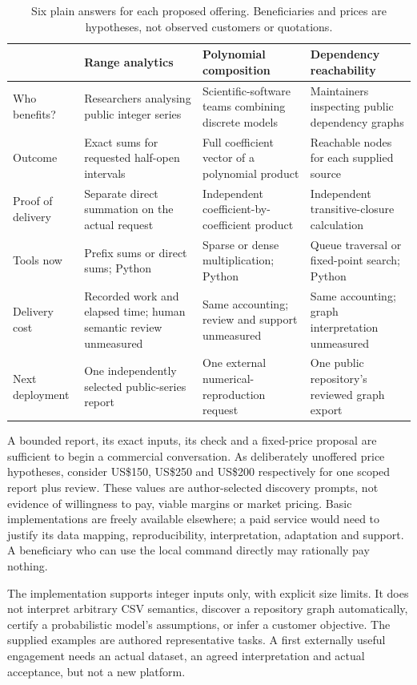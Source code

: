 \documentclass[11pt,letterpaper]{article}
\begin{document}
\begin{table}[htbp]\centering\small
\caption{Six plain answers for each proposed offering. Beneficiaries and prices are hypotheses, not observed customers or quotations.}
\begin{tabularx}{\linewidth}{@{}P{2.2cm}YYY@{}}\toprule
& Range analytics & Polynomial composition & Dependency reachability\\\midrule
Who benefits? & Researchers analysing public integer series & Scientific-software teams combining discrete models & Maintainers inspecting public dependency graphs\\
Outcome & Exact sums for requested half-open intervals & Full coefficient vector of a polynomial product & Reachable nodes for each supplied source\\
Proof of delivery & Separate direct summation on the actual request & Independent coefficient-by-coefficient product & Independent transitive-closure calculation\\
Tools now & Prefix sums or direct sums; Python & Sparse or dense multiplication; Python & Queue traversal or fixed-point search; Python\\
Delivery cost & Recorded work and elapsed time; human semantic review unmeasured & Same accounting; review and support unmeasured & Same accounting; graph interpretation unmeasured\\
Next deployment & One independently selected public-series report & One external numerical-reproduction request & One public repository's reviewed graph export\\\bottomrule
\end{tabularx}
\label{tab:offers}
\end{table}

A bounded report, its exact inputs, its check and a fixed-price proposal are sufficient to begin a commercial conversation. As deliberately unoffered price hypotheses, consider US\$150, US\$250 and US\$200 respectively for one scoped report plus review. These values are author-selected discovery prompts, not evidence of willingness to pay, viable margins or market pricing. Basic implementations are freely available elsewhere; a paid service would need to justify its data mapping, reproducibility, interpretation, adaptation and support. A beneficiary who can use the local command directly may rationally pay nothing.

The implementation supports integer inputs only, with explicit size limits. It does not interpret arbitrary CSV semantics, discover a repository graph automatically, certify a probabilistic model's assumptions, or infer a customer objective. The supplied examples are authored representative tasks. A first externally useful engagement needs an actual dataset, an agreed interpretation and actual acceptance, but not a new platform.
\end{document}
